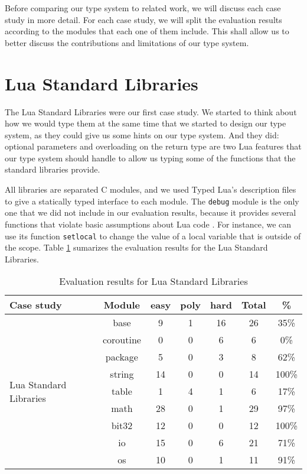 Before comparing our type system to related work, we will discuss
each case study in more detail.
For each case study, we will split the evaluation results according
to the modules that each one of them include.
This shall allow us to better discuss the contributions and limitations
of our type system.

\section{Lua Standard Libraries}

The Lua Standard Libraries \citep{luamanual} were our first case study.
We started to think about how we would type them at the same time that
we started to design our type system, as they could give us some hints
on our type system.
And they did: optional parameters and overloading on the return type
are two Lua features that our type system should handle to allow us
typing some of the functions that the standard libraries provide.

All libraries are separated C modules, and we used Typed Lua's description
files to give a statically typed interface to each module.
The \texttt{debug} module is the only one that we did not include in our
evaluation results, because it provides several functions that violate
basic assumptions about Lua code \citep{luamanual}.
For instance, we can use its function \texttt{setlocal} to change the value
of a local variable that is outside of the scope.
Table \ref{tab:evallsl} sumarizes the evaluation results for the Lua Standard Libraries.

\begin{table}[!ht]
\begin{center}
\begin{tabular}{|l|c|c|c|c|c|c|}
\hline
\textbf{Case study} & \textbf{Module} & \textbf{easy} & \textbf{poly} & \textbf{hard} & \textbf{Total} & \textbf{\%} \\
\hline
\multirow{9}{*}{Lua Standard Libraries}
& base & 9 & 1 & 16 & 26 & 35\% \\
\cline{2-7}
& coroutine & 0 & 0 & 6 & 6 & 0\% \\
\cline{2-7}
& package & 5 & 0 & 3 & 8 & 62\% \\
\cline{2-7}
& string & 14 & 0 & 0 & 14 & 100\% \\
\cline{2-7}
& table & 1 & 4 & 1 & 6 & 17\% \\
\cline{2-7}
& math & 28 & 0 & 1 & 29 & 97\% \\
\cline{2-7}
& bit32 & 12 & 0 & 0 & 12 & 100\% \\
\cline{2-7}
& io & 15 & 0 & 6 & 21 & 71\% \\
\cline{2-7}
& os & 10 & 0 & 1 & 11 & 91\% \\
\hline
\end{tabular}
\end{center}
\caption{Evaluation results for Lua Standard Libraries}
\label{tab:evallsl}
\end{table}


